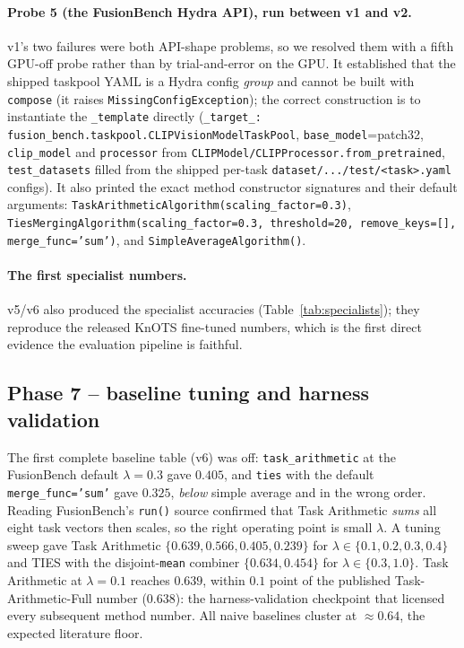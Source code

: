 \paragraph{Probe 5 (the FusionBench Hydra API), run between v1 and v2.}
v1's two failures were both API-shape problems, so we resolved them with a fifth GPU-off probe rather than
by trial-and-error on the GPU. It established that the shipped taskpool YAML is a Hydra config
\emph{group} and cannot be built with \texttt{compose} (it raises \texttt{MissingConfigException}); the
correct construction is to instantiate the \texttt{\_template} directly (\texttt{\_target\_:
fusion\_bench.taskpool.CLIPVisionModelTaskPool}, \texttt{base\_model}=patch32, \texttt{clip\_model} and
\texttt{processor} from \texttt{CLIPModel/CLIPProcessor.from\_pretrained}, \texttt{test\_datasets} filled
from the shipped per-task \texttt{dataset/.../test/<task>.yaml} configs). It also printed the exact method
constructor signatures and their default arguments: \texttt{TaskArithmeticAlgorithm(scaling\_factor=0.3)},
\texttt{TiesMergingAlgorithm(scaling\_factor=0.3, threshold=20, remove\_keys=[], merge\_func='sum')}, and
\texttt{SimpleAverageAlgorithm()}.

\paragraph{The first specialist numbers.} v5/v6 also produced the specialist accuracies
(Table~\ref{tab:specialists}); they reproduce the released KnOTS fine-tuned numbers, which is the first
direct evidence the evaluation pipeline is faithful.

\subsection{Phase 7 -- baseline tuning and harness validation}
\label{app:tuning}
The first complete baseline table (v6) was off: \texttt{task\_arithmetic} at the FusionBench default
$\lambda=0.3$ gave $0.405$, and \texttt{ties} with the default \texttt{merge\_func='sum'} gave $0.325$,
\emph{below} simple average and in the wrong order. Reading FusionBench's \texttt{run()} source confirmed
that Task Arithmetic \emph{sums} all eight task vectors then scales, so the right operating point is small
$\lambda$. A tuning sweep gave Task Arithmetic $\{0.639, 0.566, 0.405, 0.239\}$ for
$\lambda\in\{0.1,0.2,0.3,0.4\}$ and TIES with the disjoint-\texttt{mean} combiner $\{0.634, 0.454\}$ for
$\lambda\in\{0.3,1.0\}$. Task Arithmetic at $\lambda=0.1$ reaches $0.639$, within $0.1$ point of the
published Task-Arithmetic-Full number ($0.638$): the harness-validation checkpoint that licensed every
subsequent method number. All naive baselines cluster at $\approx 0.64$, the expected literature floor.

